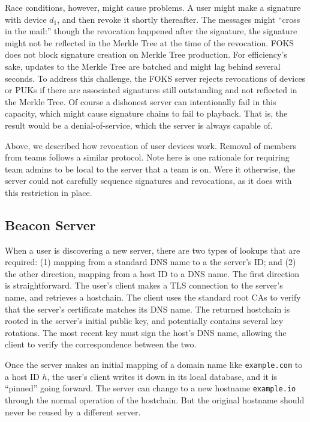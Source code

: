 Race conditions, however, might cause problems. A user might make a signature
with device $d_1$, and then revoke it shortly thereafter. The messages might
``cross in the mail:'' though the revocation happened after the signature, the
signature might not be reflected in the Merkle Tree at the time of the
revocation. FOKS does not block signature creation on Merkle Tree production.
For efficiency's sake, updates to the Merkle Tree are batched and might lag
behind several seconds. To address this challenge, the FOKS server
rejects revocations of devices or PUKs if there are associated signatures still
outstanding and not reflected in the Merkle Tree. Of course a dishonest server
can intentionally fail in this capacity, which might cause signature chains to
fail to playback. That is, the result would be a denial-of-service, which the
server is always capable of.

Above, we described how revocation of user devices work. Removal of members from 
teams follows a similar protocol.  Note here is one rationale for requiring team
admins to be local to the server that a team is on. Were it otherwise, the
server could not carefully sequence signatures and revocations, as it does with
this restriction in place.

\subsection{Beacon Server}
\label{sec:beacon}

When a user is discovering a new server, there are two types of lookups that are
required: (1) mapping from a standard DNS name to a the server's ID; and (2) the
other direction, mapping from a host ID to a DNS name. The first direction is
straightforward.  The user's client makes a TLS connection to the server's name,
and retrieves a hostchain.  The client uses the standard root CAs to verify that
the server's certificate matches its DNS name. The returned hostchain is rooted
in the server's initial public key, and potentially contains several key
rotations. The most recent key must sign the host's DNS name, allowing the
client to verify the correspondence between the two. 

Once the server makes an initial mapping of a domain name like
\texttt{example.com} to a host ID $h$, the user's client writes it down in its
local database, and it is ``pinned'' going forward. The server can change to a
new hostname \texttt{example.io} through the normal operation of the
hostchain. But the original hostname should never be reused by a different
server.

